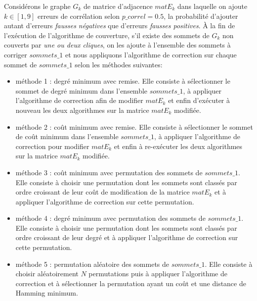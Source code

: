 Consid\'erons le graphe $G_k$ de matrice d'adjacence $matE_k$ dans laquelle on ajoute $k \in [1,9]$ erreurs de corr\'elation selon $p\_correl=0.5$, la probabilit\'e d'ajouter autant d'erreurs {\em fausses n\'egatives } que d'erreurs {\em fausses positives}. 
\`A la fin de l'ex\'ecution de l'algorithme de couverture, s'il existe des sommets de $G_k$ non couverts par {\em une ou deux cliques}, on les ajoute \`a l'ensemble des sommets \`a corriger $sommets\_1$ et nous appliquons l'algorithme  de correction sur chaque sommet de $sommets\_1$ selon les m\'ethodes suivantes:
\begin{itemize}
\item m\'ethode 1 : degr\'e minimum avec remise.\newline
Elle consiste \`a s\'electionner le sommet de degr\'e minimum dans l'ensemble $sommets\_1$, \`a appliquer l'algorithme de correction afin de modifier $matE_k$ et enfin  d'ex\'ecuter \`a nouveau les deux algorithmes sur la matrice $matE_k$ modifi\'ee.
\item m\'ethode 2 : co\^ut minimum avec remise. \newline
Elle consiste \`a s\'electionner le sommet de co\^ut minimum dans l'ensemble $sommets\_1$, \`a appliquer l'algorithme de correction pour modifier $matE_k$ et enfin \`a re-ex\'ecuter les deux algorithmes sur la matrice $matE_k$ modifi\'ee.
\item m\'ethode 3 : co\^ut minimum avec permutation des sommets de $sommets\_1$. \newline
Elle consiste \`a choisir une permutation dont les sommets sont class\'es par ordre croissant de leur co\^ut  de modification de la matrice $matE_k$ et \`a appliquer l'algorithme de correction sur cette permutation.
\item m\'ethode 4 :  degr\'e minimum avec  permutation des sommets de $sommets\_1$. \newline
Elle consiste \`a choisir une permutation dont les sommets sont class\'es par ordre croissant de leur degr\'e et \`a appliquer l'algorithme de correction sur cette permutation.
\item m\'ethode 5 : permutation al\'eatoire des sommets de $sommets\_1$. \newline
Elle consiste \`a choisir al\'eatoirement $N$ permutations puis \`a appliquer l'algorithme de correction et \`a s\'electionner la permutation ayant un co\^ut et une distance de Hamming minimum.
\end{itemize}

